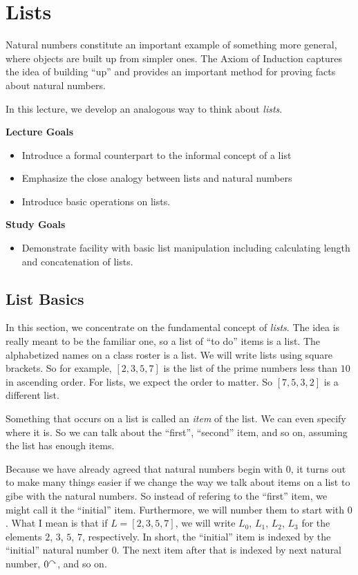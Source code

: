 \chapter{Lists}

Natural numbers constitute an important example of something more
general, where objects are built up from simpler
ones. The Axiom of Induction captures the idea of building ``up''
and provides an important method for proving facts about natural
numbers.

In this lecture, we develop an analogous way to think about \emph{lists}. 

\begin{goals}
\noindent \textbf{Lecture Goals}
\begin{itemize}
\item Introduce a formal counterpart to the informal concept of a list
\item Emphasize the close analogy between lists and natural numbers
\item Introduce basic operations on lists.
\end{itemize}

\noindent\textbf{Study Goals}
\begin{itemize}
\item Demonstrate facility with basic list manipulation including calculating length and 
concatenation of lists.
\end{itemize}
\end{goals}

\section{List Basics}

In this section, we concentrate on the fundamental concept of \emph{lists}. The idea is really meant to
be the familiar one, so a list of ``to do'' items is a list. The alphabetized names on a class roster is a list. 
We will write lists using square brackets. So for example, $[2,3,5,7]$ is the list of 
the prime numbers less than $10$ in ascending order. For lists, we expect the order to matter. 
So $[7,5,3,2]$ is a different list.

Something that occurs on a list is called an \emph{item} of the list. We can even
specify where it is. So we can talk about the ``first'', ``second'' item, and so on, 
assuming the list has enough items. 

Because we have already agreed that natural numbers begin with $0$, it turns out to make
many things easier if we change the way we talk about items on a list to gibe with the natural
numbers. So instead of refering to the ``first'' item, we might call it the ``initial'' item.
Furthermore, we will number them to start with $0$. What I mean is that if $L=[2,3,5,7]$,
we will write $L_0$, $L_1$, $L_2$, $L_3$ for the elements $2$, $3$, $5$, $7$, respectively. 
In short, the ``initial'' item is indexed by the ``initial'' natural number $0$. The next item after that is indexed by next natural number, $0^\curvearrowright$,
and so on.


